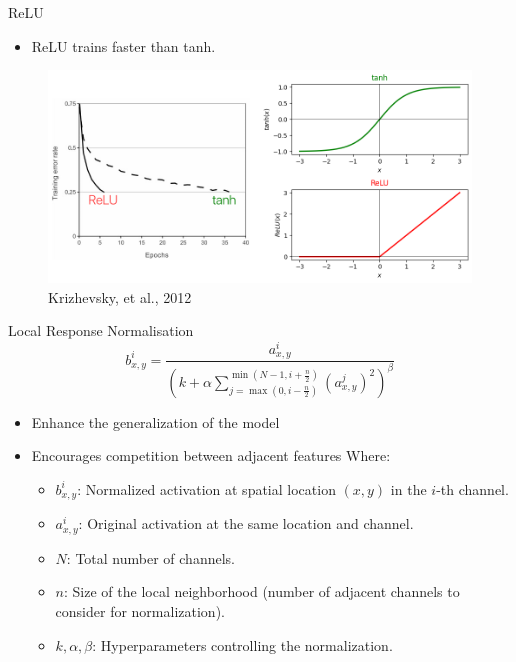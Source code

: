 \documentclass[serif, aspectratio=169]{beamer}
\begin{document}
\begin{frame}{ReLU}
	\begin{itemize}
		\item ReLU trains faster than tanh.
	\end{itemize}
	\begin{figure}[htbp]
		\begin{center}
			\includegraphics[keepaspectratio, scale=0.3]{pic/relu_faster}
			\caption*{\scriptsize Krizhevsky, et al., 2012}
		\end{center}
	\end{figure}
\end{frame}

\begin{frame}{Local Response Normalisation}
	\[
	b_{x, y}^i = \frac{a_{x, y}^i}{\left( k + \alpha \sum_{j=\max(0, i - \frac{n}{2})}^{\min(N - 1, i + \frac{n}{2})} \left( a_{x, y}^j \right)^2 \right)^\beta}
	\]
	\begin{itemize}
		\item Enhance the generalization of the model
		\item Encourages competition between adjacent features Where:
		\vspace{1em}
		\begin{itemize}
			\item \( b_{x, y}^i \): Normalized activation at spatial location \((x, y)\) in the \(i\)-th channel.
			\item \( a_{x, y}^i \): Original activation at the same location and channel.
			\item \( N \): Total number of channels.
			\item \( n \): Size of the local neighborhood (number of adjacent channels to consider for normalization).
			\item \( k, \alpha, \beta \): Hyperparameters controlling the normalization.
		\end{itemize}
	\end{itemize}
\end{frame}
\end{document}
